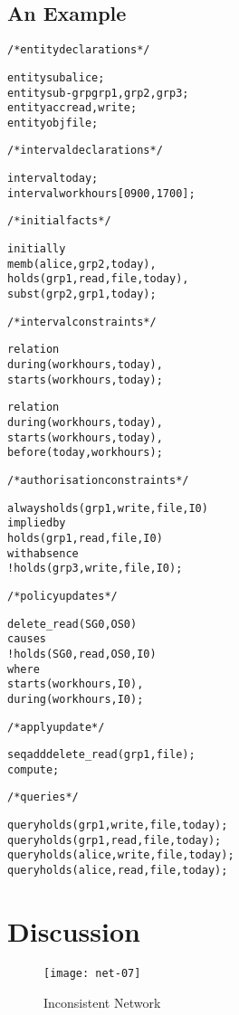 \documentclass[11pt]{report}
\newenvironment{vverbatim}
{
  \begin{alltt}
}
{
  \vspace{-\baselineskip}
  \end{alltt}
}
\begin{document}
      \subsection{An Example}    

        \begin{vverbatim}
  /* entity declarations */

  entity sub alice;
  entity sub-grp grp1, grp2, grp3;
  entity acc read, write;
  entity obj file;
  
  /* interval declarations */

  interval today;
  interval workhours [0900, 1700];

  /* initial facts */

  initially
    memb(alice, grp2, today),
    holds(grp1, read, file, today),
    subst(grp2, grp1, today);
  
  /* interval constraints */

  relation
    during(workhours, today),
    starts(workhours, today);
  
  relation
    during(workhours, today),
    starts(workhours, today),
    before(today,workhours);

  /* authorisation constraints */
  
  always holds(grp1, write, file, I0)
    implied by
      holds(grp1, read, file, I0)
    with absence
      !holds(grp3, write, file, I0);

  /* policy updates */
  
  delete\_read(SG0, OS0)
    causes
      !holds(SG0, read, OS0, I0)
    where
      starts(workhours, I0),
      during(workhours, I0);

  /* apply update */

  seq add delete\_read(grp1, file);
  compute;

  /* queries */

  query holds(grp1, write, file, today);
  query holds(grp1, read, file, today);
  query holds(alice, write, file, today);
  query holds(alice, read, file, today);
      \end{vverbatim}
  
    \section{Discussion}

      \begin{figure}[[tbhp]
        \begin{center}
          \texttt{[image: net-07]}
          \caption{Inconsistent Network}
          \label{fig-net-ex-07}
        \end{center}
      \end{figure}
\end{document}

